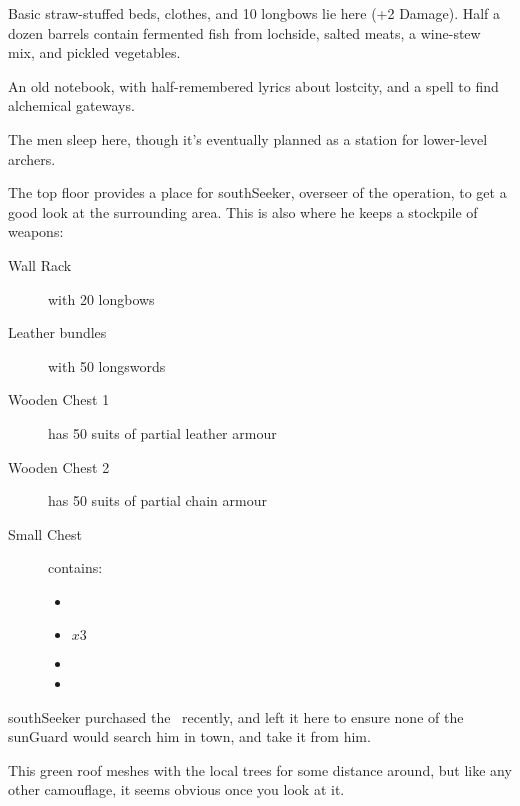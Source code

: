 \begin{multicols}{2}

Basic straw-stuffed beds, clothes, and 10 longbows lie here (+2 Damage).
Half a dozen barrels contain fermented fish from \gls{lochside}, salted meats, a wine-stew mix, and pickled vegetables.

An old notebook, with half-remembered lyrics about \gls{lostcity}, and a spell to find alchemical gateways.

\vspace{2em}
\findGatewaySpell


The men sleep here, though it's eventually planned as a station for lower-level archers.


The top floor provides a place for \gls{southSeeker}, overseer of the operation, to get a good look at the surrounding area.
This is also where he keeps a stockpile of weapons:

\begin{description}
  \item[Wall Rack]
  with
  20 longbows
  \item[Leather bundles]
  with
  50 longswords
  \item[Wooden Chest 1]
  has
  50 suits of partial leather armour
  \item[Wooden Chest 2]
  has
  50 suits of partial chain armour
  \item[Small Chest]
  contains:
  \begin{itemize}
    \item
    \lootMagic
    \item
    \lootMagic $x 3$
    \item
    \lootMagic
    \item
    \lootTalisman
  \end{itemize}
\end{description}

\addtocounter{treasure}{-1}
\Gls{southSeeker} purchased the \lootTalisman\ recently, and left it here to ensure none of the \gls{sunGuard} would search him in \gls{town}, and take it from him.

\showTalisman


This green roof meshes with the local trees for some distance around, but like any other camouflage, it seems obvious once you look at it.


\end{multicols}
